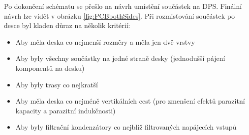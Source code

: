 Po dokončení schématu se přešlo na návrh umístění součástek na DPS. Finální návrh lze vidět v obrázku \ref{fig:PCBbothSides}. Při rozmisťování součástek po desce byl kladen důraz na několik kritérií:
\begin{itemize}
	\item Aby měla deska co nejmenší rozměry a měla jen dvě vrstvy
	\item Aby byly všechny součástky na jedné straně desky (jednodušší pájení komponentů na desku)
	\item Aby byly trasy co nejkratší
	\item Aby měla deska co nejméně vertikálních cest (pro zmenšení efektů parazitní kapacity a parazitní indukčnosti)
	\item Aby byly filtrační kondenzátory co nejblíž filtrovaných napájecích vstupů
\end{itemize}

